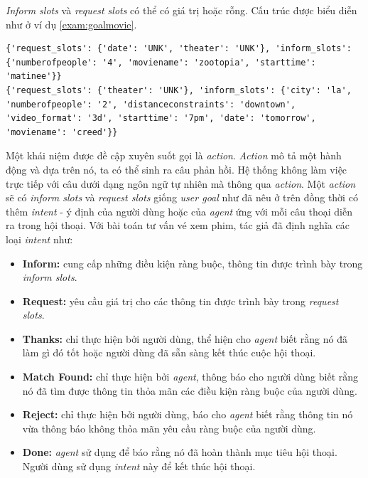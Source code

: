 \textit{Inform slots} và \textit{request slots} có thể có giá trị hoặc rỗng. Cấu trúc được biểu diễn như ở ví dụ \ref{exam:goalmovie}.

\renewcommand{\lstlistingname}{Ví dụ}
\begin{lstlisting}[caption={Mục tiêu người dùng của hệ thống tư vấn chọn vé xem phim},label={exam:goalmovie},language=code_en,firstnumber=1]
{'request_slots': {'date': 'UNK', 'theater': 'UNK'}, 'inform_slots': {'numberofpeople': '4', 'moviename': 'zootopia', 'starttime': 'matinee'}}
{'request_slots': {'theater': 'UNK'}, 'inform_slots': {'city': 'la', 'numberofpeople': '2', 'distanceconstraints': 'downtown', 'video_format': '3d', 'starttime': '7pm', 'date': 'tomorrow', 'moviename': 'creed'}}
\end{lstlisting}

Một khái niệm được đề cập xuyên suốt gọi là \textit{action}. \textit{Action} mô tả một hành động và dựa trên nó, ta có thể sinh ra câu phản hồi. Hệ thống không làm việc trực tiếp với câu dưới dạng ngôn ngữ tự nhiên mà thông qua \textit{action}. Một \textit{action} sẽ có \textit{inform slots} và \textit{request slots} giống \textit{user goal} như đã nêu ở trên đồng thời có thêm \textit{intent} - ý định của người dùng hoặc của \textit{agent} ứng với mỗi câu thoại diễn ra trong hội thoại. Với bài toán tư vấn vé xem phim, tác giả đã định nghĩa các loại \textit{intent} như:

\begin{itemize}
    \item \textbf{Inform:} cung cấp những điều kiện ràng buộc, thông tin được trình bày trong \textit{inform slots}.
    \item \textbf{Request:} yêu cầu giá trị cho các thông tin được trình bày trong \textit{request slots}.
    \item \textbf{Thanks:} chỉ thực hiện bởi người dùng, thể hiện cho \textit{agent} biết rằng nó đã làm gì đó tốt hoặc người dùng đã sẵn sàng kết thúc cuộc hội thoại.
    \item \textbf{Match Found:} chỉ thực hiện bởi \textit{agent}, thông báo cho người dùng biết rằng nó đã tìm được thông tin thỏa mãn các điều kiện ràng buộc của người dùng.
    \item \textbf{Reject:} chỉ thực hiện bởi người dùng, báo cho \textit{agent} biết rằng thông tin nó vừa thông báo không thỏa mãn yêu cầu ràng buộc của người dùng.
    \item \textbf{Done:} \textit{agent} sử dụng để báo rằng nó đã hoàn thành mục tiêu hội thoại. Người dùng sử dụng \textit{intent} này để kết thúc hội thoại.
\end{itemize}

